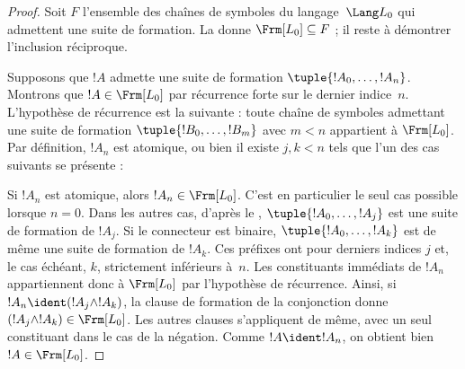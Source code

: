 \documentclass[../../../include/open-logic-section]{subfiles}
\begin{document}
\begin{proof}
Soit $F$ l'ensemble des chaînes de symboles du langage~$\Lang L_0$
qui admettent une suite de formation. La
 donne $\Frm[L_0] \subseteq F$ ;
il reste à démontrer l'inclusion réciproque.

Supposons que $!A$ admette une suite de formation
$\tuple{!A_0,\dotsc,!A_n}$. Montrons que $!A \in \Frm[L_0]$ par
récurrence forte sur le dernier indice~$n$. L'hypothèse de récurrence
est la suivante : toute chaîne de symboles admettant une suite de
formation $\tuple{!B_0,\dotsc,!B_m}$ avec $m < n$ appartient à
$\Frm[L_0]$. Par définition, $!A_n$ est atomique, ou bien il existe
$j,k < n$ tels que l'un des cas suivants se présente :
\begin{enumerate}
\end{enumerate}
Si $!A_n$ est atomique, alors $!A_n \in \Frm[L_0]$. C'est en
particulier le seul cas possible lorsque $n=0$. Dans les autres cas,
d'après le ,
$\tuple{!A_0,\dotsc,!A_j}$ est une suite de formation de $!A_j$.
Si le connecteur est binaire, $\tuple{!A_0,\dotsc,!A_k}$ est de
même une suite de formation de $!A_k$. Ces préfixes ont pour derniers
indices $j$ et, le cas échéant, $k$, strictement inférieurs à~$n$.
Les constituants immédiats de $!A_n$ appartiennent donc à $\Frm[L_0]$
par l'hypothèse de récurrence. Ainsi, si $!A_n \ident (!A_j \land !A_k)$,
la clause de formation de la conjonction donne
$(!A_j \land !A_k)\in\Frm[L_0]$. Les autres clauses s'appliquent de même,
avec un seul constituant dans le cas de la négation. Comme
$!A\ident !A_n$, on obtient bien $!A\in\Frm[L_0]$.
\end{proof}
%
%
%
%
%
%
\end{document}
